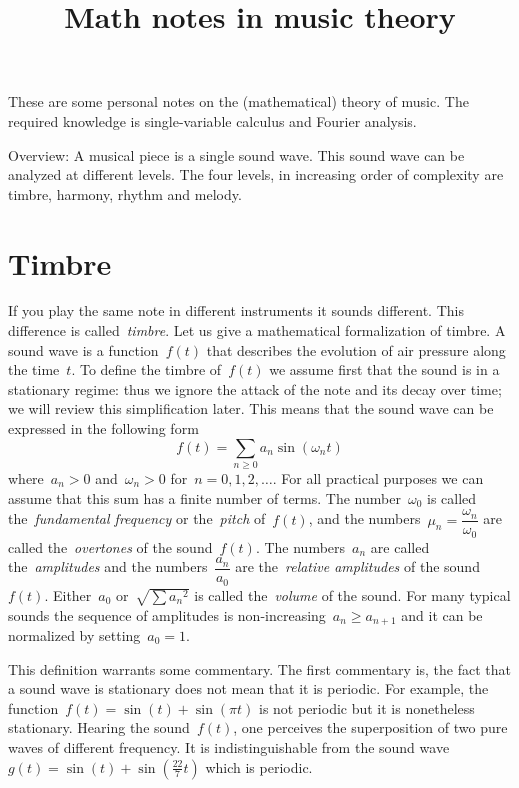 \title{Math notes in music theory}

These are some personal notes on the (mathematical) theory of music.
The required knowledge is single-variable calculus and Fourier analysis.

Overview: A musical piece is a single sound wave.  This sound wave can be
analyzed at different levels.  The four levels, in increasing order of
complexity are timbre, harmony, rhythm and melody.

\section{Timbre}

If you play the same note in different instruments it sounds
different.  This difference is called~\emph{timbre}.
Let us give a mathematical formalization of timbre.
A sound wave is a function~$f(t)$ that describes the evolution of air
pressure along the time~$t$.  To define the timbre of~$f(t)$ we assume first
that the sound is in a stationary regime: thus we ignore the attack of the note
and its decay over time; we will review this simplification later.  This means
that the sound wave can be expressed in the following form
\begin{equation}\label{eq:soundwave}
	f(t) = \sum_{n\ge 0} a_n\sin\left(\omega_n t\right)
\end{equation}
where~$a_n>0$ and~$\omega_n>0$ for~$n=0,1,2,\ldots$.  For all practical
purposes we can assume that this sum has a finite number of terms.  The
number~$\omega_0$ is called the~\emph{fundamental frequency} or
the~\emph{pitch} of~$f(t)$, and the numbers~$\mu_n=\dfrac{\omega_n}{\omega_0}$
are called the~\emph{overtones} of the sound~$f(t)$.  The numbers~$a_n$ are
called the~\emph{amplitudes} and the numbers~$\dfrac{a_n}{a_0}$ are
the~\emph{relative amplitudes} of the sound~$f(t)$.  Either~$a_0$
or~$\sqrt{\sum {a_n}^2}$ is called the~\emph{volume} of the
sound.  For many typical sounds the sequence of amplitudes is
non-increasing~$a_n\ge a_{n+1}$ and it can be normalized by setting~$a_0=1$.

This definition warrants some commentary.  The first commentary is, the fact
that a sound wave is stationary does not mean that it is periodic.  For
example, the function~$f(t)=\sin(t)+\sin(\pi t)$ is not periodic but it is
nonetheless stationary.  Hearing the sound~$f(t)$, one perceives the
superposition of two pure waves of different frequency.  It is
indistinguishable from the sound
wave~$g(t)=\sin(t)+\sin\left(\tfrac{22}7t\right)$ which is periodic.

